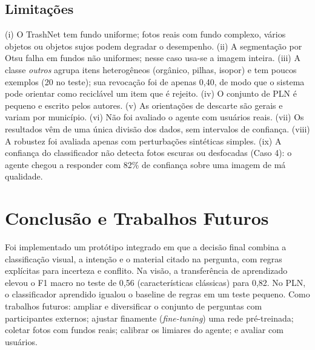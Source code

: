 \documentclass[conference]{IEEEtran}
\begin{document}
\subsection{Limitações}\label{sec:limitacoes}
(i) O TrashNet tem fundo uniforme; fotos reais com fundo complexo, vários objetos ou objetos sujos podem degradar o desempenho. (ii) A segmentação por Otsu falha em fundos não uniformes; nesse caso usa-se a imagem inteira. (iii) A classe \emph{outros} agrupa itens heterogêneos (orgânico, pilhas, isopor) e tem poucos exemplos (20 no teste); sua revocação foi de apenas 0,40, de modo que o sistema pode orientar como reciclável um item que é rejeito. (iv) O conjunto de PLN é pequeno e escrito pelos autores. (v) As orientações de descarte são gerais e variam por município. (vi) Não foi avaliado o agente com usuários reais. (vii) Os resultados vêm de uma única divisão dos dados, sem intervalos de confiança. (viii) A robustez foi avaliada apenas com perturbações sintéticas simples. (ix) A confiança do classificador não detecta fotos escuras ou desfocadas (Caso 4): o agente chegou a responder com 82\% de confiança sobre uma imagem de má qualidade.

\section{Conclusão e Trabalhos Futuros}
Foi implementado um protótipo integrado em que a decisão final combina a classificação visual, a intenção e o material citado na pergunta, com regras explícitas para incerteza e conflito. Na visão, a transferência de aprendizado elevou o F1 macro no teste de 0,56 (características clássicas) para 0,82. No PLN, o classificador aprendido igualou o baseline de regras em um teste pequeno. Como trabalhos futuros: ampliar e diversificar o conjunto de perguntas com participantes externos; ajustar finamente (\emph{fine-tuning}) uma rede pré-treinada; coletar fotos com fundos reais; calibrar os limiares do agente; e avaliar com usuários.
\end{document}
